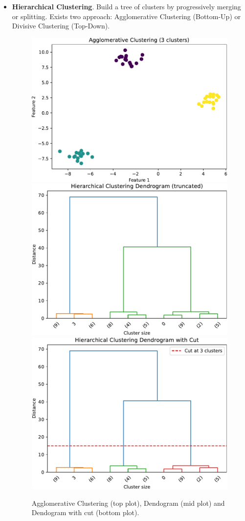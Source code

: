 \begin{itemize}
    \item \textbf{Hierarchical Clustering}. Build a tree of clusters by progressively merging or splitting. Exists two approach: Agglomerative Clustering (Bottom-Up) or Divisive Clustering (Top-Down).
    \begin{figure}[!htp]
        \centering
        \includegraphics[width=.71\textwidth]{img/hierarchical-clustering/hierarchical-clustering.pdf}
        \includegraphics[width=.71\textwidth]{img/hierarchical-clustering/hierarchical-clustering-2.pdf}
        \includegraphics[width=.71\textwidth]{img/hierarchical-clustering/hierarchical-clustering-3.pdf}
        \caption{Agglomerative Clustering (top plot), Dendogram (mid plot) and Dendogram with cut (bottom plot).}
        \label{fig: hierarchical clustering}
    \end{figure}


\end{itemize}

